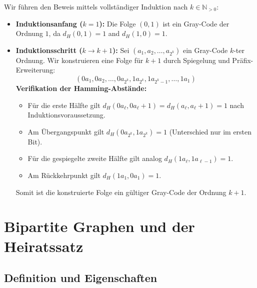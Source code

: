 \begin{math-stroke}
\begin{short-proof}
Wir führen den Beweis mittels vollständiger Induktion nach $k \in \mathbb{N}_{>0}$:
\begin{itemize}
    \item \textbf{Induktionsanfang ($k=1$):}
    Die Folge $(0, 1)$ ist ein Gray-Code der Ordnung $1$, da $d_H(0, 1) = 1$ and $d_H(1, 0) = 1$.
    \item \textbf{Induktionsschritt ($k \to k+1$):}
    Sei $(a_1, a_2, \dots, a_{2^k})$ ein Gray-Code $k$-ter Ordnung. Wir konstruieren eine Folge für $k+1$ durch Spiegelung und Präfix-Erweiterung:
    \[
    (0a_1, 0a_2, \dots, 0a_{2^k}, 1a_{2^k}, 1a_{2^k-1}, \dots, 1a_1)
    \]
    \textbf{Verifikation der Hamming-Abstände:}
    \begin{itemize}
        \item Für die erste Hälfte gilt $d_H(0a_\ell, 0a_\ell+1) = d_H(a_\ell, a_\ell+1) = 1$ nach Induktionsvoraussetzung.
        \item Am Übergangspunkt gilt $d_H(0a_{2^k}, 1a_{2^k}) = 1$ (Unterschied nur im ersten Bit).
        \item Für die gespiegelte zweite Hälfte gilt analog $d_H(1a_\ell, 1a_{\ell-1}) = 1$.
        \item Am Rückkehrpunkt gilt $d_H(1a_1, 0a_1) = 1$.
    \end{itemize}
    Somit ist die konstruierte Folge ein gültiger Gray-Code der Ordnung $k+1$.
\end{itemize}
\end{short-proof}
\end{math-stroke}

\section{Bipartite Graphen und der Heiratssatz}
\subsection{Definition und Eigenschaften}

